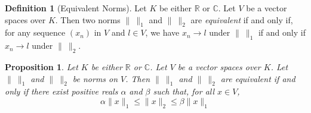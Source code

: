 \documentclass{book}
\newtheorem{prop}[ax]{Proposition}
\theoremstyle{definition}
\newtheorem{df}[ax]{Definition}
\begin{document}
\begin{df}[Equivalent Norms]
Let $K$ be either $\mathbb{R}$ or $\mathbb{C}$. Let $V$ be a vector spaces over $K$. Then two norms $\|\ \|_1$ and $\|\ \|_2$ are \emph{equivalent} if and only if, for any sequence $(x_n)$ in $V$ and $l \in V$, we have $x_n \rightarrow l$ under $\|\ \|_1$ if and only if $x_n \rightarrow l$ under $\|\ \|_2$.
\end{df}

\begin{prop}
Let $K$ be either $\mathbb{R}$ or $\mathbb{C}$. Let $V$ be a vector spaces over $K$. Let $\|\ \|_1$ and $\|\ \|_2$ be norms on $V$. Then $\|\ \|_1$ and $\|\ \|_2$ are equivalent if and only if there exist positive reals $\alpha$ and $\beta$ such that, for all $x \in V$,
\begin{equation}
\label{eq:eqnorm}
 \alpha \| x \|_1 \leq \| x \|_2 \leq \beta \| x \|_1
 \end{equation}
\end{prop}
\end{document}
